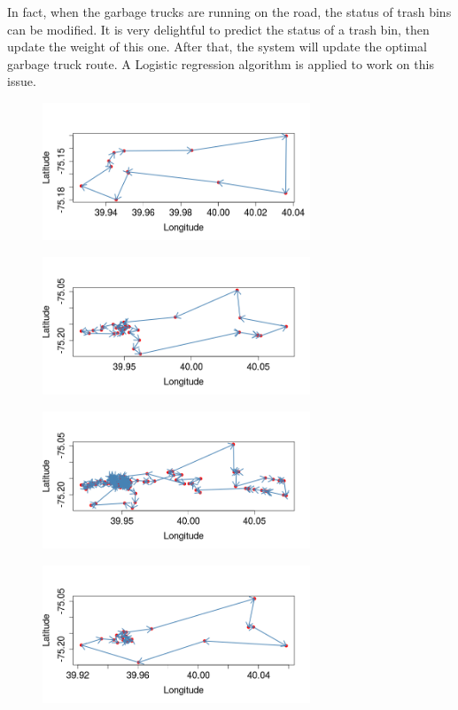 \documentclass[conference]{IEEEtran}
\begin{document}
In fact, when the garbage trucks are running on the road, the status of trash bins can be modified. It is very delightful to predict the status of a trash bin, then update the weight of this one. After that, the system will update the optimal garbage truck route. A Logistic regression algorithm is applied to work on this issue. 
\begin{figure}
	\centering
	\begin{minipage}{8cm}
		\includegraphics[width=8cm]{Cluster1}
		\label{fig1a}
	\end{minipage}
	\begin{minipage}{8cm}
		\includegraphics[width=8cm]{Cluster2}
		\label{fig1b}
	\end{minipage}
	
	
	\begin{minipage}{8cm}
		\includegraphics[width=8cm]{Cluster3}
		\label{fig1a}
	\end{minipage}
	\begin{minipage}{8cm}
		\includegraphics[width=8cm]{Cluster4}
		\label{fig1b}
	\end{minipage}
	

\end{figure}
\end{document}
